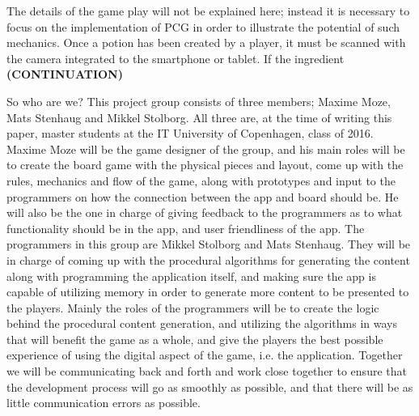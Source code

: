 The details of the game play will not be explained here; instead it is necessary to focus on the implementation of PCG in order to illustrate the potential of such mechanics. Once a potion has been created by a player, it must be scanned with the camera integrated to the smartphone or tablet. If the ingredient \textbf{(CONTINUATION)}


So who are we? This project group consists of three members; Maxime Moze, Mats Stenhaug and Mikkel Stolborg. All three are, at the time of writing this paper, master students at the IT University of Copenhagen, class of 2016. Maxime Moze will be the game designer of the group, and his main roles will be to create the board game with the physical pieces and layout, come up with the rules, mechanics and flow of the game, along with prototypes and input to the programmers on how the connection between the app and board should be. He will also be the one in charge of giving feedback to the programmers as to what functionality should be in the app, and user friendliness of the app.
The programmers in this group are Mikkel Stolborg and Mats Stenhaug. They will be in charge of coming up with the procedural algorithms for generating the content along with programming the application itself, and making sure the app is capable of utilizing memory in order to generate more content to be presented to the players. Mainly the roles of the programmers will be to create the logic behind the procedural content generation, and utilizing the algorithms in ways that will benefit the game as a whole, and give the players the best possible experience of using the digital aspect of the game, i.e. the application.
Together we will be communicating back and forth and work close together to ensure that the development process will go as smoothly as possible, and that there will be as little communication errors as possible.



